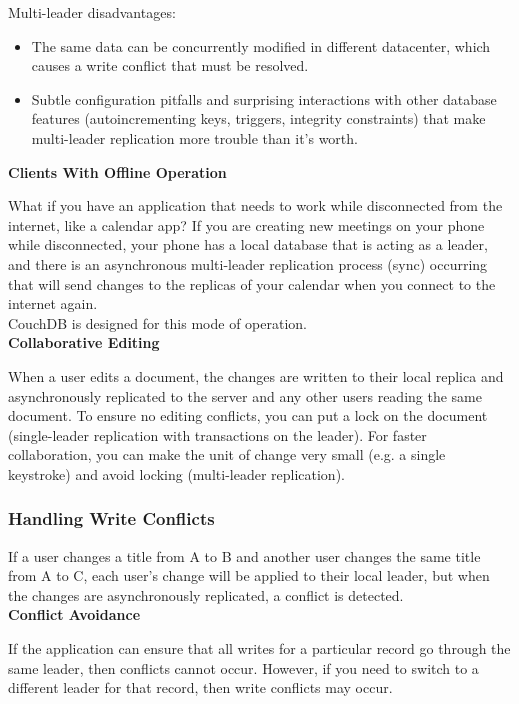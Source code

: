 \documentclass[12pt, titlepage]{article}
\newcommand{\subsubsubsection}[1]{\small \textbf{#1} \medskip}
\begin{document}
Multi-leader disadvantages:
\begin{itemize}
	\item The same data can be concurrently modified in different datacenter, which causes a write conflict that must be resolved.
	\item Subtle configuration pitfalls and surprising interactions with other database features (autoincrementing keys, triggers, integrity constraints) that make multi-leader replication more trouble than it's worth.
\end{itemize}

\subsubsubsection{Clients With Offline Operation}

What if you have an application that needs to work while disconnected from the internet, like a calendar app? If you are creating new meetings on your phone while disconnected, your phone has a local database that is acting as a leader, and there is an asynchronous multi-leader replication process (sync) occurring that will send changes to the replicas of your calendar when you connect to the internet again. \\

CouchDB is designed for this mode of operation. \\

\subsubsubsection{Collaborative Editing}

When a user edits a document, the changes are written to their local replica and asynchronously replicated to the server and any other users reading the same document. To ensure no editing conflicts, you can put a lock on the document (single-leader replication with transactions on the leader). For faster collaboration, you can make the unit of change very small (e.g. a single keystroke) and avoid locking (multi-leader replication).

\subsubsection{Handling Write Conflicts}

If a user changes a title from A to B and another user changes the same title from A to C, each user's change will be applied to their local leader, but when the changes are asynchronously replicated, a conflict is detected. \\

\subsubsubsection{Conflict Avoidance}

If the application can ensure that all writes for a particular record go through the same leader, then conflicts cannot occur. However, if you need to switch to a different leader for that record, then write conflicts may occur. \\
\end{document}
